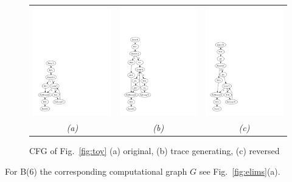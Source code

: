 \documentclass{book}
\newcommand{\reffig}[1]{{Fig.~\ref{#1}}}
\begin{document}
\begin{figure}[ht]
  \centering
  \begin{tabular}{ccc}
    \includegraphics[width=.25\textwidth]{cfg_ts}
    &
    \includegraphics[width=.25\textwidth]{cfg_tape}
    &
    \includegraphics[width=.25\textwidth]{cfg_adj}
    \\
    \em (a) & \em (b) & \em (c)
  \end{tabular}
  \caption{CFG of \reffig{fig:toy} (a) original, (b) trace generating, (c) reversed}\label{fig:cfg}
\end{figure}
For B(6) the corresponding computational graph $G$  see 
\reffig{fig:elims}(a).  
\end{document}
